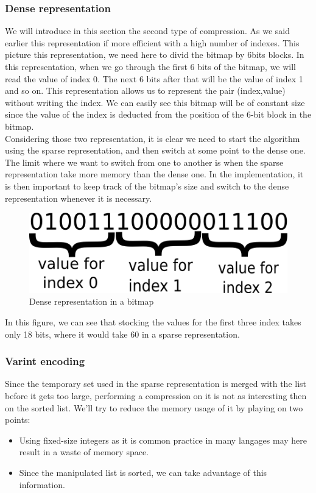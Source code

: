\documentclass{article}
\begin{document}
\subsubsection{Dense representation}
We will introduce in this section the second type of compression. As we said earlier this representation if more 
efficient with a high number of indexes. This picture this representation, we need here to divid the bitmap by 
6bits blocks. In this representation, when we go through the first 6 bits of the bitmap, we will read the value of
index 0. The next 6 bits after that will be the value of index 1 and so on. This representation allows us to 
represent the pair (index,value) without writing the index. We can easily see this bitmap will be of constant size
since the value of the index is deducted from the position of the 6-bit block in the bitmap. \\
Considering those two representation, it is clear we need to start the algorithm using the sparse representation,
and then switch at some point to the dense one. The limit where we want to switch from one to another is when the
sparse representation take more memory than the dense one. In the implementation, it is then important to keep
track of the bitmap's size and switch to the dense representation whenever it is necessary.

\begin{center}
\begin{figure}[h]
\includegraphics[scale=0.5]{dense.png}
\caption{Dense representation in a bitmap}
\end{figure}
\end{center}

In this figure, we can see that stocking the values for the first three index takes only
18 bits, where it would take 60 in a sparse representation.


\subsubsection{Varint encoding}
Since the temporary set used in the sparse representation is merged
with the list before it gets too large, performing a compression on it
is not as interesting then on the sorted list. We'll try to reduce the
memory usage of it by playing on two points:
\begin{itemize}
\item Using fixed-size integers as it is common practice in many
langages may here result in a waste of memory space.
\item Since the manipulated list is sorted, we can take advantage of
 this information.
 \end{itemize}
\end{document}
